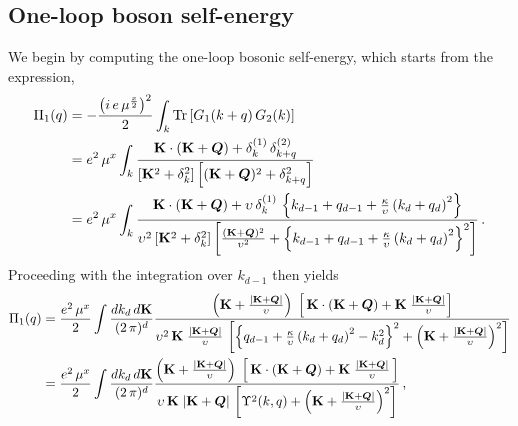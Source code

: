 \subsection{One-loop boson self-energy}
\label{oneloopbos}

We begin by computing the one-loop bosonic self-energy, which starts from the expression,
\begin{align}
\label{bosloop}
\Pi_1 (q) & = - \frac{
\left ( i \, e  \,\mu^{\frac {x} {2} } \right )^2} {2}
 \int_k \mbox{Tr}
\left[  G_1 (k+q)\, G_2 (k) \right] 
\nonumber \\ & = e^2 \, \mu^{x}  \int_k 
\frac{\mathbf  K \cdot (\mathbf  K +{\boldsymbol Q}) + \delta_k^{(1)} \, \delta_{k+q}^{(2)}
}
{ \left [\mathbf  K^2 + \delta_k^2 \right ] 
\left [(\mathbf  K +{\boldsymbol Q})^2 + \delta_{k+q}^2 \right ]}
\nonumber \\ & = e^2 \, \mu^{x}  \int_k 
\frac{\mathbf  K \cdot (\mathbf  K +{\boldsymbol Q}) 
+ \upsilon \,\delta_k^{(1)} \, 
 \left \lbrace  k_{d-1} + q_{d-1} 
+  \frac{\kappa} {\upsilon} \left( k_d + q_d \right)^2 \right \rbrace
}
{ \upsilon^2
\left [ \mathbf  K^2 + \delta_k^2 \right ] 
\left [ \frac{(\mathbf  K +{\boldsymbol Q}) ^2 }
{\upsilon^2} + 
 \left \lbrace k_{d-1} + q_{d-1} 
+  \frac{\kappa} {\upsilon} 
\left( k_d + q_d \right)^2  \right \rbrace^2 \right ]} \,.
\end{align}
Proceeding with the integration over $k_{d-1}$ then yields \cite{ips-cavity}
\begin{align}
\label{eqpi0}
\Pi_1 (q)  &  = \frac{e^2 \, \mu^{x}} {2} 
\int \frac{ d k_{d} \, d\mathbf  K}{(2 \, \pi)^d} 
\frac{ \left(  {\mathbf  K}
+ \frac{|\mathbf  K + {\boldsymbol Q}|} {\upsilon}  \right) 
\; \left[ \,\mathbf  K \cdot (\mathbf  K +{\boldsymbol Q}) 
+ {\mathbf  K}\;  \frac{ |\mathbf  K +{\boldsymbol Q}|} {\upsilon}   \right]  
}
{ 
\upsilon^2\, {\mathbf  K}\; \frac{ |\mathbf  K +{\boldsymbol Q}|} {\upsilon}
\, 
\left[ \left \lbrace 
 q_{d-1} 
+  \frac{\kappa} {\upsilon} \left( k_d + q_d \right)^2 
-k_d^2 \right \rbrace^2
 + \left ( {\mathbf  K}
+\frac{ |\mathbf  K +{\boldsymbol Q}|} {\upsilon} \right)^2
\right] }    \nonumber \\
&  = \frac{e^2 \, \mu^{x}} {2} 
\int \frac{ d k_{d} \, d\mathbf  K}{(2 \, \pi)^d} 
\frac{ \left(  {\mathbf  K}
+ \frac{|\mathbf  K + {\boldsymbol Q}|} {\upsilon}  \right) 
\; \left[ \,\mathbf  K \cdot (\mathbf  K +{\boldsymbol Q}) 
+ {\mathbf  K}\;\frac{ |\mathbf  K +{\boldsymbol Q}|} {\upsilon} \,  \right]  
}
{ \upsilon \, {\mathbf  K}\; |\mathbf  K +{\boldsymbol Q}|\,
\left[ \Upsilon^2 (k,q) +  \left ( {\mathbf  K}
+\frac{ |\mathbf  K +{\boldsymbol Q}|} {\upsilon} \right)^2
\right ] }  \,,
\end{align}
